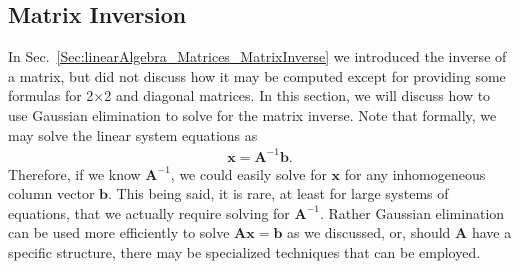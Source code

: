 

\subsection{Matrix Inversion} \label{Sec:linearAlgebra_SystemsOfLinearEquations_MatrixInversion}

In Sec.~\ref{Sec:linearAlgebra_Matrices_MatrixInverse} we introduced the inverse of a matrix, but did not discuss how it may be computed except for providing some formulas for 2$\times$2 and diagonal matrices. In this section, we will discuss how to use Gaussian elimination to solve for the matrix inverse. Note that formally, we may solve the linear system equations as 
\begin{align}
  \mathbf{x} = \mathbf{A}^{-1} \mathbf{b}.
\end{align}
Therefore, if we know $\mathbf{A}^{-1}$, we could easily solve for $\mathbf{x}$ for any inhomogeneous column vector $\mathbf{b}$. This being said, it is rare, at least for large systems of equations, that we actually require solving for $\mathbf{A}^{-1}$. Rather Gaussian elimination can be used more efficiently to solve $\mathbf{Ax} = \mathbf{b}$ as we discussed, or, should $\mathbf{A}$ have a specific structure, there may be specialized techniques that can be employed.

